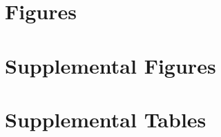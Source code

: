 \section{Figures}
\setcounter{figure}{0}
\setcounter{table}{0}
\renewcommand{\thefigure}{\arabic{figure}}
\renewcommand{\thetable}{\arabic{table}}





\clearpage
\section{Supplemental Figures}
\setcounter{figure}{0}
\setcounter{table}{0}
\renewcommand{\thefigure}{S\arabic{figure}}
\renewcommand{\thetable}{S\arabic{table}}



% 
\clearpage
\section{Supplemental Tables}
\clearpage